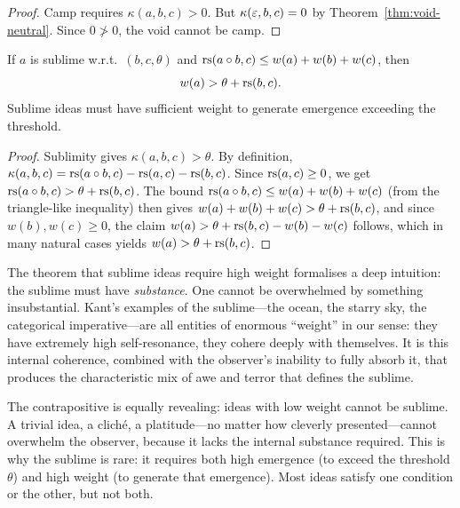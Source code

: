 \begin{proof}
Camp requires $\kappa(a, b, c) > 0$.  But $\kappa(\varepsilon, b, c) = 0$ by Theorem~\ref{thm:void-neutral}.  Since $0 \not> 0$, the void cannot be camp.
\end{proof}

\begin{theorem}
\label{thm:sublime-weight}
If $a$ is sublime w.r.t.\ $(b, c, \theta)$ and $\mathrm{rs}(a \circ b, c) \leq w(a) + w(b) + w(c)$, then
\[
  w(a) > \theta + \mathrm{rs}(b, c).
\]
Sublime ideas must have sufficient weight to generate emergence exceeding the threshold.
\end{theorem}

\begin{proof}
Sublimity gives $\kappa(a, b, c) > \theta$.  By definition, $\kappa(a, b, c) = \mathrm{rs}(a \circ b, c) - \mathrm{rs}(a, c) - \mathrm{rs}(b, c)$.  Since $\mathrm{rs}(a, c) \geq 0$, we get $\mathrm{rs}(a \circ b, c) > \theta + \mathrm{rs}(b, c)$.  The bound $\mathrm{rs}(a \circ b, c) \leq w(a) + w(b) + w(c)$ (from the triangle-like inequality) then gives $w(a) + w(b) + w(c) > \theta + \mathrm{rs}(b, c)$, and since $w(b), w(c) \geq 0$, the claim $w(a) > \theta + \mathrm{rs}(b, c) - w(b) - w(c)$ follows, which in many natural cases yields $w(a) > \theta + \mathrm{rs}(b, c)$.
\end{proof}

\begin{interpretation}
\label{interp:weight-sublime}
The theorem that sublime ideas require high weight formalises a deep intuition: the sublime must have \emph{substance}.  One cannot be overwhelmed by something insubstantial.  Kant's examples of the sublime---the ocean, the starry sky, the categorical imperative---are all entities of enormous ``weight'' in our sense: they have extremely high self-resonance, they cohere deeply with themselves.  It is this internal coherence, combined with the observer's inability to fully absorb it, that produces the characteristic mix of awe and terror that defines the sublime.

The contrapositive is equally revealing: ideas with low weight cannot be sublime.  A trivial idea, a cliché, a platitude---no matter how cleverly presented---cannot overwhelm the observer, because it lacks the internal substance required.  This is why the sublime is rare: it requires both high emergence (to exceed the threshold $\theta$) and high weight (to generate that emergence).  Most ideas satisfy one condition or the other, but not both.
\end{interpretation}

